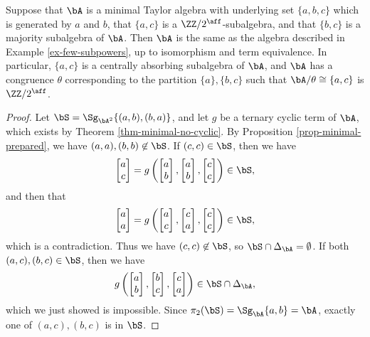 \begin{prop} Suppose that $\bA$ is a minimal Taylor algebra with underlying set $\{a,b,c\}$ which is generated by $a$ and $b$, that $\{a,c\}$ is a $\ZZ/2^{\aff}$-subalgebra, and that $\{b,c\}$ is a majority subalgebra of $\bA$. Then $\bA$ is the same as the algebra described in Example \ref{ex-few-subpowers}, up to isomorphism and term equivalence. In particular, $\{a,c\}$ is a centrally absorbing subalgebra of $\bA$, and $\bA$ has a congruence $\theta$ corresponding to the partition $\{a\},\{b,c\}$ such that $\bA/\theta \cong \{a,c\}$ is $\ZZ/2^{\aff}$.
\end{prop}
\begin{proof} Let $\bS = \Sg_{\bA^2}\{(a,b),(b,a)\}$, and let $g$ be a ternary cyclic term of $\bA$, which exists by Theorem \ref{thm-minimal-no-cyclic}. By Proposition \ref{prop-minimal-prepared}, we have $(a,a),(b,b) \not\in \bS$. If $(c,c) \in \bS$, then we have
\[
\begin{bmatrix}a\\c\end{bmatrix} = g\left(\begin{bmatrix}a\\b\end{bmatrix},\begin{bmatrix}a\\b\end{bmatrix},\begin{bmatrix}c\\c\end{bmatrix}\right) \in \bS,
\]
and then that
\[
\begin{bmatrix}a\\a\end{bmatrix} = g\left(\begin{bmatrix}a\\c\end{bmatrix},\begin{bmatrix}c\\a\end{bmatrix},\begin{bmatrix}c\\c\end{bmatrix}\right) \in \bS,
\]
which is a contradiction. Thus we have $(c,c) \not\in \bS$, so $\bS \cap \Delta_\bA = \emptyset$. If both $(a,c), (b,c) \in \bS$, then we have
\[
g\left(\begin{bmatrix}a\\b\end{bmatrix},\begin{bmatrix}b\\c\end{bmatrix},\begin{bmatrix}c\\a\end{bmatrix}\right) \in \bS \cap \Delta_\bA,
\]
which we just showed is impossible. Since $\pi_2(\bS) = \Sg_\bA\{a,b\} = \bA$, exactly one of $(a,c), (b,c)$ is in $\bS$.


\end{proof}

